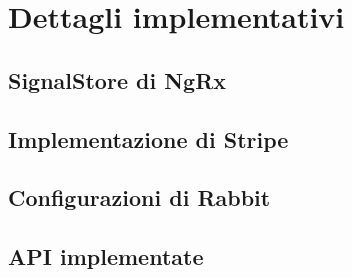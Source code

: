 \chapter{Dettagli implementativi}
\section{SignalStore di NgRx}

\section{Implementazione di Stripe}

\section{Configurazioni di Rabbit}

\section{API implementate}
